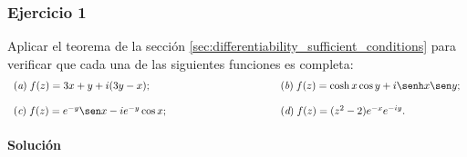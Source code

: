 \documentclass[a4paper]{report}
\begin{document}
\subsubsection{Ejercicio 1}

Aplicar el teorema de la sección \ref{sec:differentiability_sufficient_conditions} para verificar que cada una de las siguientes funciones es completa:
\[
 \begin{array}{ll}
  (\textit{a})\;f(z)=3x+y+i(3y-x);\qquad\qquad\qquad\qquad\qquad&(\textit{b})\;f(z)=\cosh x\cos y+i\senh x\sen y;\\[\bigskipamount]
  (\textit{c})\;f(z)=e^{-y}\sen x-ie^{-y}\cos x;\qquad\qquad\qquad\qquad\qquad&(\textit{d})\;f(z)=(z^2-2)e^{-x}e^{-iy}.
 \end{array}
\]

\paragraph{Solución} 
\end{document}
